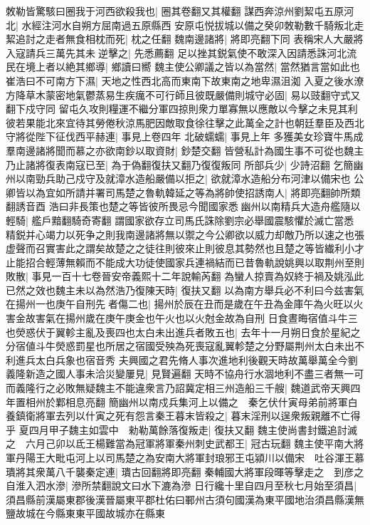 敇勒皆驚駭曰圈我于河西欲殺我也|{
	圈其卷翻又其權翻}
謀西奔涼州劉絜屯五原河北|{
	水經注河水自朔方屈南過五原縣西}
安原屯悦拔城以備之癸卯敇勒數千騎叛北走絜追討之走者無食相枕而死|{
	枕之任翻}
魏南邊諸將|{
	將即亮翻下同}
表稱宋人大嚴將入寇請兵三萬先其未逆擊之|{
	先悉薦翻}
足以挫其鋭氣使不敢深入因請悉誅河北流民在境上者以絶其鄉導|{
	鄉讀曰嚮}
魏主使公卿議之皆以為當然|{
	當然猶言當如此也}
崔浩曰不可南方下濕|{
	天地之性西北高而東南下故東南之地卑濕沮洳}
入夏之後水潦方降草木蒙密地氣鬱蒸易生疾癘不可行師且彼既嚴備則城守必固|{
	易以豉翻守式又翻下戍守同}
留屯久攻則糧運不繼分軍四掠則衆力單寡無以應敵以今擊之未見其利彼若果能北來宜待其勞倦秋涼馬肥因敵取食徐往擊之此萬全之計也朝廷羣臣及西北守將從陛下征伐西平赫連|{
	事見上卷四年}
北破蠕蠕|{
	事見上年}
多獲美女珍寶牛馬成羣南邊諸將聞而慕之亦欲南鈔以取資財|{
	鈔楚交翻}
皆營私計為國生事不可從也魏主乃止諸將復表南寇已至|{
	為于偽翻復扶又翻乃復復叛同}
所部兵少|{
	少詩沼翻}
乞簡幽州以南勁兵助己戍守及就漳水造船嚴備以拒之|{
	欲就漳水造船分布河津以備宋也}
公卿皆以為宜如所請并署司馬楚之魯軌韓延之等為將帥使招誘南人|{
	將即亮翻帥所類翻誘音酉}
浩曰非長策也楚之等皆彼所畏忌今聞國家悉幽州以南精兵大造舟艦隨以輕騎|{
	艦戶黯翻騎奇寄翻}
謂國家欲存立司馬氏誅除劉宗必舉國震駭懼於滅亡當悉精鋭并心竭力以死争之則我南邊諸將無以禦之今公卿欲以威力却敵乃所以速之也張虚聲而召實害此之謂矣故楚之之徒往則彼來止則彼息其勢然也且楚之等皆纎利小才止能招合輕薄無賴而不能成大功徒使國家兵連禍結而已昔魯軌說姚興以取荆州至則敗散|{
	事見一百十七卷晉安帝義熙十二年說輸芮翻}
為蠻人掠賣為奴終于禍及姚泓此已然之效也魏主未以為然浩乃復陳天時|{
	復扶又翻}
以為南方舉兵必不利曰今兹害氣在揚州一也庚午自刑先者傷二也|{
	揚州於辰在丑而是歲在午丑為金庫午為火旺以火害金故害氣在揚州歲在庚午庚金也午火也以火尅金故為自刑}
日食晝晦宿值斗牛三也熒惑伏于翼軫主亂及喪四也太白未出進兵者敗五也|{
	去年十一月朔日食於星紀之分宿値斗牛熒惑罰星也所居之宿國受殃為死喪寇亂翼軫楚之分野屬荆州太白未出不利進兵太白兵象也宿音秀}
夫興國之君先脩人事次進地利後觀天時故萬舉萬全今劉義隆新造之國人事未洽災變屢見|{
	見賢遍翻}
天時不協舟行水涸地利不盡三者無一可而義隆行之必敗無疑魏主不能違衆言乃詔冀定相三州造船三千艘|{
	魏道武帝天興四年置相州於鄴相息亮翻}
簡幽州以南戍兵集河上以備之　秦乞伏什寅母弟前將軍白養鎮衛將軍去列以什寅之死有怨言秦王暮末皆殺之|{
	暮末淫刑以逞衆叛親離不亡得乎}
夏四月甲子魏主如雲中　勑勒萬餘落復叛走|{
	復扶又翻}
魏主使尚書封鐵追討滅之　六月己卯以氐王楊難當為冠軍將軍秦州刺史武都王|{
	冠古玩翻}
魏主使平南大將軍丹陽王大毗屯河上以司馬楚之為安南大將軍封琅邪王屯潁川以備宋　吐谷渾王慕璝將其衆萬八千襲秦定連|{
	璝古回翻將即亮翻}
秦輔國大將軍段暉等擊走之　到彦之自淮入泗水滲|{
	滲所禁翻說文曰水下漉為滲}
日行纔十里自四月至秋七月始至須昌|{
	須昌縣前漢屬東郡後漢晉屬東平郡杜佑曰鄆州古須句國漢為東平國地治須昌縣漢無鹽故城在今縣東東平國故城亦在縣東}
